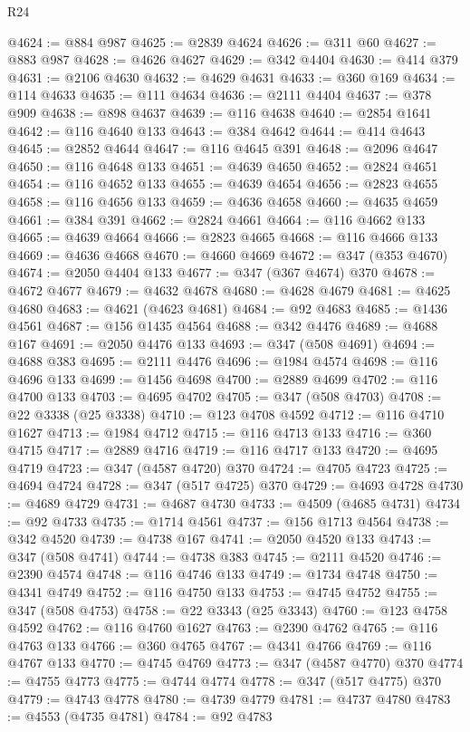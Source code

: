 \begin{lexlean}{R24}
\begin{coremodule}
@4624 := @884 @987
@4625 := @2839 @4624
@4626 := @311 @60
@4627 := @883 @987
@4628 := @4626 @4627
@4629 := @342 @4404
@4630 := @414 @379
@4631 := @2106 @4630
@4632 := @4629 @4631
@4633 := @360 @169
@4634 := @114 @4633
@4635 := @111 @4634
@4636 := @2111 @4404
@4637 := @378 @909
@4638 := @898 @4637
@4639 := @116 @4638
@4640 := @2854 @1641
@4642 := @116 @4640 @133
@4643 := @384 @4642
@4644 := @414 @4643
@4645 := @2852 @4644
@4647 := @116 @4645 @391
@4648 := @2096 @4647
@4650 := @116 @4648 @133
@4651 := @4639 @4650
@4652 := @2824 @4651
@4654 := @116 @4652 @133
@4655 := @4639 @4654
@4656 := @2823 @4655
@4658 := @116 @4656 @133
@4659 := @4636 @4658
@4660 := @4635 @4659
@4661 := @384 @391
@4662 := @2824 @4661
@4664 := @116 @4662 @133
@4665 := @4639 @4664
@4666 := @2823 @4665
@4668 := @116 @4666 @133
@4669 := @4636 @4668
@4670 := @4660 @4669
@4672 := @347 (@353 @4670)
@4674 := @2050 @4404 @133
@4677 := @347 (@367 @4674) @370
@4678 := @4672 @4677
@4679 := @4632 @4678
@4680 := @4628 @4679
@4681 := @4625 @4680
@4683 := @4621 (@4623 @4681)
@4684 := @92 @4683
@4685 := @1436 @4561
@4687 := @156 @1435 @4564
@4688 := @342 @4476
@4689 := @4688 @167
@4691 := @2050 @4476 @133
@4693 := @347 (@508 @4691)
@4694 := @4688 @383
@4695 := @2111 @4476
@4696 := @1984 @4574
@4698 := @116 @4696 @133
@4699 := @1456 @4698
@4700 := @2889 @4699
@4702 := @116 @4700 @133
@4703 := @4695 @4702
@4705 := @347 (@508 @4703)
@4708 := @22 @3338 (@25 @3338)
@4710 := @123 @4708 @4592
@4712 := @116 @4710 @1627
@4713 := @1984 @4712
@4715 := @116 @4713 @133
@4716 := @360 @4715
@4717 := @2889 @4716
@4719 := @116 @4717 @133
@4720 := @4695 @4719
@4723 := @347 (@4587 @4720) @370
@4724 := @4705 @4723
@4725 := @4694 @4724
@4728 := @347 (@517 @4725) @370
@4729 := @4693 @4728
@4730 := @4689 @4729
@4731 := @4687 @4730
@4733 := @4509 (@4685 @4731)
@4734 := @92 @4733
@4735 := @1714 @4561
@4737 := @156 @1713 @4564
@4738 := @342 @4520
@4739 := @4738 @167
@4741 := @2050 @4520 @133
@4743 := @347 (@508 @4741)
@4744 := @4738 @383
@4745 := @2111 @4520
@4746 := @2390 @4574
@4748 := @116 @4746 @133
@4749 := @1734 @4748
@4750 := @4341 @4749
@4752 := @116 @4750 @133
@4753 := @4745 @4752
@4755 := @347 (@508 @4753)
@4758 := @22 @3343 (@25 @3343)
@4760 := @123 @4758 @4592
@4762 := @116 @4760 @1627
@4763 := @2390 @4762
@4765 := @116 @4763 @133
@4766 := @360 @4765
@4767 := @4341 @4766
@4769 := @116 @4767 @133
@4770 := @4745 @4769
@4773 := @347 (@4587 @4770) @370
@4774 := @4755 @4773
@4775 := @4744 @4774
@4778 := @347 (@517 @4775) @370
@4779 := @4743 @4778
@4780 := @4739 @4779
@4781 := @4737 @4780
@4783 := @4553 (@4735 @4781)
@4784 := @92 @4783

\end{coremodule}
\end{lexlean}
